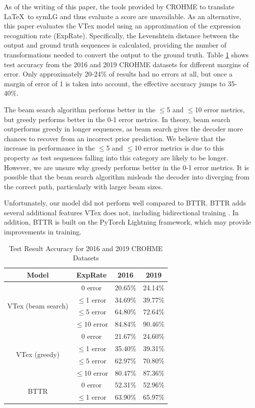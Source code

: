 As of the writing of this paper, the tools provided by CROHME to translate \LaTeX\ to symLG and thus evaluate a score are unavailable. As an alternative, this paper evaluates the VTex model using an approximation of the expression recognition rate (ExpRate). Specifically, the Levenshtein distance between the output and ground truth sequences is calculated, providing the number of transformations needed to convert the output to the ground truth. Table \ref{table:testresults} shows test accuracy from the 2016 and 2019 CROHME datasets for different margins of error. Only approximately 20-24\% of results had no errors at all, but once a margin of error of 1 is taken into account, the effective accuracy jumps to 35-40\%. 

The beam search algorithm performs better in the $\leq$5 and $\leq$10 error metrics, but greedy performs better in the 0-1 error metrics. In theory, beam search outperforms greedy in longer sequences, as beam search gives the decoder more chances to recover from an incorrect prior prediction. We believe that the increase in performance in the $\leq$5 and $\leq$10 error metrics is due to this property as test sequences falling into this category are likely to be longer. However, we are unsure why greedy performs better in the 0-1 error metrics. It is possible that the beam search algorithm misleads the decoder into diverging from the correct path, particularly with larger beam sizes.

Unfortunately, our model did not perform well compared to BTTR. BTTR adds several additional features VTex does not, including bidirectional training \cite{ZhaoBTTR2021}. In addition, BTTR is built on the PyTorch Lightning framework, which may provide improvements in training.

\begin{table}
\centering
    \begin{tabular}{|c | c | c | c |} 
     \hline
     Model & ExpRate & 2016 & 2019 \\
     \hline\hline
     \multirow{4}{4em}{VTex (beam search)} & 0 error & 20.65\% & 24.14\% \\
     & $\leq$1 error & 34.69\% & 39.77\% \\
     & $\leq$5 error & 64.80\% & 72.64\% \\
     & $\leq$10 error & 84.84\% & 90.46\% \\
     \hline
     \multirow{4}{4em}{VTex (greedy)} & 0 error & 21.67\% & 24.60\% \\
     & $\leq$1 error & 35.40\% & 39.31\% \\
     & $\leq$5 error & 62.97\% & 70.80\% \\
     & $\leq$10 error & 80.47\% & 87.36\% \\
     \hline
     \multirow{2}{4em}{BTTR} & 0 error & 52.31\% & 52.96\% \\
     & $\leq$1 error & 63.90\% & 65.97\% \\
     \hline
    \end{tabular}
\caption{Test Result Accuracy for 2016 and 2019 CROHME Datasets}
\label{table:testresults}
\end{table}
